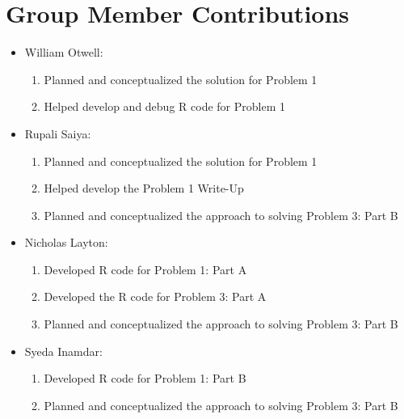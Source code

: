 \documentclass[11pt]{article}
\begin{document}
\section{Group Member Contributions}
\begin{itemize}
	\item William Otwell:
	\begin{enumerate}
		\item Planned and conceptualized the solution for Problem 1
		\item Helped develop and debug R code for Problem 1
	\end{enumerate}
	
	\item Rupali Saiya:
	\begin{enumerate}
		\item Planned and conceptualized the solution for Problem 1
		\item Helped develop the Problem 1 Write-Up
		\item Planned and conceptualized the approach to solving Problem 3: Part B
	\end{enumerate}
	
	\item Nicholas Layton:
	\begin{enumerate}
		\item Developed R code for Problem 1: Part A
		\item Developed the R code for Problem 3: Part A
		\item Planned and conceptualized the approach to solving Problem 3: Part B
	\end{enumerate}
	
	\item Syeda Inamdar:
	\begin{enumerate}
		\item Developed R code for Problem 1: Part B
		\item Planned and conceptualized the approach to solving Problem 3: Part B
	\end{enumerate}
\end{itemize}
\pagebreak
\end{document}

